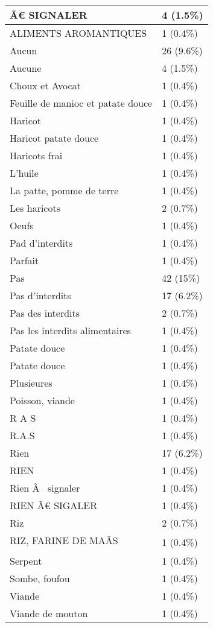 \documentclass[
]{book}
\begin{document}
\begin{tabular}{l|l}
\hline
Ã€ SIGNALER & 4 (1.5\%)\\
\hline
ALIMENTS AROMANTIQUES & 1 (0.4\%)\\
\hline
Aucun & 26 (9.6\%)\\
\hline
Aucune & 4 (1.5\%)\\
\hline
Choux et Avocat & 1 (0.4\%)\\
\hline
Feuille de manioc et patate douce & 1 (0.4\%)\\
\hline
Haricot & 1 (0.4\%)\\
\hline
Haricot patate douce & 1 (0.4\%)\\
\hline
Haricots frai & 1 (0.4\%)\\
\hline
L'huile & 1 (0.4\%)\\
\hline
La patte, pomme de terre & 1 (0.4\%)\\
\hline
Les haricots & 2 (0.7\%)\\
\hline
Oeufs & 1 (0.4\%)\\
\hline
Pad d'interdits & 1 (0.4\%)\\
\hline
Parfait & 1 (0.4\%)\\
\hline
Pas & 42 (15\%)\\
\hline
Pas d'interdits & 17 (6.2\%)\\
\hline
Pas des interdits & 2 (0.7\%)\\
\hline
Pas les interdits alimentaires & 1 (0.4\%)\\
\hline
Patate  douce & 1 (0.4\%)\\
\hline
Patate douce & 1 (0.4\%)\\
\hline
Plusieures & 1 (0.4\%)\\
\hline
Poisson, viande & 1 (0.4\%)\\
\hline
R A S & 1 (0.4\%)\\
\hline
R.A.S & 1 (0.4\%)\\
\hline
Rien & 17 (6.2\%)\\
\hline
RIEN & 1 (0.4\%)\\
\hline
Rien Ã  signaler & 1 (0.4\%)\\
\hline
RIEN Ã€ SIGALER & 1 (0.4\%)\\
\hline
Riz & 2 (0.7\%)\\
\hline
RIZ, FARINE DE MAÃS & 1 (0.4\%)\\
\hline
Serpent & 1 (0.4\%)\\
\hline
Sombe, foufou & 1 (0.4\%)\\
\hline
Viande & 1 (0.4\%)\\
\hline
Viande de mouton & 1 (0.4\%)\\

\end{tabular}
\end{document}
